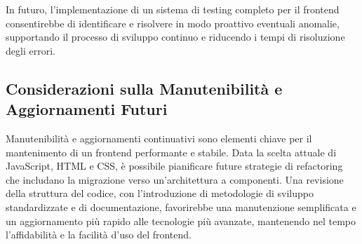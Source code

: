 In futuro, l’implementazione di un sistema di testing completo per il frontend consentirebbe di identificare e risolvere in modo proattivo eventuali anomalie, supportando il processo di sviluppo continuo e riducendo i tempi di risoluzione degli errori.

\subsection{Considerazioni sulla Manutenibilità e Aggiornamenti Futuri}
\label{sec:manutenzione_aggiornamenti}

Manutenibilità e aggiornamenti continuativi sono elementi chiave per il mantenimento di un frontend performante e stabile. Data la scelta attuale di JavaScript, HTML e CSS, è possibile pianificare future strategie di refactoring che includano la migrazione verso un’architettura a componenti. Una revisione della struttura del codice, con l’introduzione di metodologie di sviluppo standardizzate e di documentazione, favorirebbe una manutenzione semplificata e un aggiornamento più rapido alle tecnologie più avanzate, mantenendo nel tempo l’affidabilità e la facilità d’uso del frontend.
